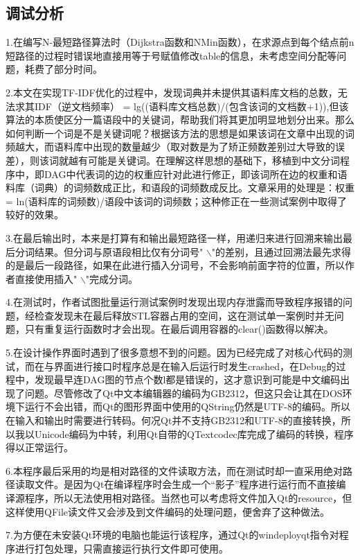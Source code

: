 \documentclass[UTF8]{ctexart}
\begin{document}
\subsection{调试分析}
	1.在编写N-最短路径算法时（Dijkstra函数和NMin函数），在求源点到每个结点前n短路径的过程时错误地直接用等于号赋值修改table的信息，未考虑空间分配等问题，耗费了部分时间。\par
	2.本文在实现TF-IDF优化的过程中，发现词典并未提供其语料库文档的总数，无法求其IDF（逆文档频率） = lg((语料库文档总数)/(包含该词的文档数+1)),但该算法的本质使区分一篇语段中的关键词，帮助我们将其更加明显地划分出来。那么如何判断一个词是不是关键词呢？根据该方法的思想是如果该词在文章中出现的词频越大，而语料库中出现的数量越少（取对数是为了矫正频数差别过大导致的误差），则该词就越有可能是关键词。在理解这样思想的基础下，移植到中文分词程序中，即DAG中代表词的边的权重应针对此进行修正，即该词所在边的权重和语料库（词典）的词频数成正比，和语段的词频数成反比。文章采用的处理是：权重 = ln(语料库的词频数)/语段中该词的词频数；这种修正在一些测试案例中取得了较好的效果。\par
	3.在最后输出时，本来是打算有和输出最短路径一样，用递归来进行回溯来输出最后分词结果。但分词与原语段相比仅有分词号" $\backslash$"的差别，且通过回溯法最先求得的是最后一段路径，如果在此进行插入分词号，不会影响前面字符的位置，所以作者直接使用插入" $\backslash$"完成分词。\par
	4.在测试时，作者试图批量运行测试案例时发现出现内存泄露而导致程序报错的问题，经检查发现未在最后释放STL容器占用的空间，这在测试单一案例时并无问题，只有重复运行函数时才会出现。在最后调用容器的clear()函数得以解决。\par
	5.在设计操作界面时遇到了很多意想不到的问题。因为已经完成了对核心代码的测试，而在与界面进行接口时程序总是在输入后运行时发生crashed，在Debug的过程中，发现最早连DAG图的节点个数l都是错误的，这才意识到可能是中文编码出现了问题。尽管修改了Qt中文本编辑器的编码为GB2312，但这只会让其在DOS环境下运行不会出错，而Qt的图形界面中使用的QString仍然是UTF-8的编码。所以在输入和输出时需要进行转码。何况Qt并不支持GB2312和UTF-8的直接转换，所以我以Unicode编码为中转，利用Qt自带的QTextcodec库完成了编码的转换，程序得以正常运行。\par
	6.本程序最后采用的均是相对路径的文件读取方法，而在测试时却一直采用绝对路径读取文件。是因为Qt在编译程序时会生成一个“影子”程序进行运行而不直接编译源程序，所以无法使用相对路径。当然也可以考虑将文件加入Qt的resource，但这样使用QFile读文件又会涉及到文件编码的处理问题，便舍弃了这种做法。\par
	7.为方便在未安装Qt环境的电脑也能运行该程序，通过Qt的windeployqt指令对程序进行打包处理，只需直接运行执行文件即可使用。
\newpage
\end{document}
